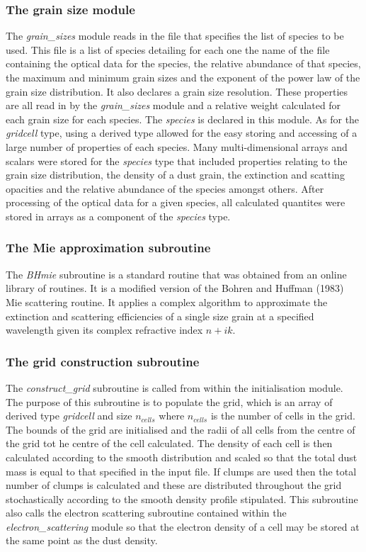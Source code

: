 		\subsubsection{The grain size module}
		The \textit{grain\_sizes} module reads in the file that specifies the list of species to be used.  This file is a list of species detailing for each one the name of the file containing the optical data for the species, the relative abundance of that species, the maximum and minimum grain sizes and the exponent of the power law of the grain size distribution.  It also declares a grain size resolution.  These properties are all read in by the \textit{grain\_sizes} module and a relative weight calculated for each grain size for each species.
		The \textit{species} is declared in this module.  As for the \textit{gridcell} type, using a derived type allowed for the easy storing and accessing of a large number of properties of each species.  Many multi-dimensional arrays and scalars were stored for the \textit{species} type that included properties relating to the grain size distribution, the density of a dust grain, the extinction and scatting opacities and the relative abundance of the species amongst others.  After processing of the optical data for a given species, all calculated quantites were stored in arrays as a component of the \textit{species} type. 
		
		\subsubsection{The Mie approximation subroutine}
		The \textit{BHmie} subroutine is a standard routine that  was obtained from an online library of routines.  It is a modified version of the Bohren and Huffman (1983) %
		Mie scattering routine.  It applies a complex algorithm to approximate the extinction and scattering efficiencies of a single size grain at a specified wavelength given its complex refractive index $n+ik$.
		
		\subsubsection{The grid construction subroutine}
		The \textit{construct\_grid} subroutine is called from within the initialisation module.  The purpose of this subroutine is to populate the grid, which is an array of derived type \textit{gridcell} and size $n_{cells}$ where $n_{cells}$ is the number of cells in the grid.   The bounds of the grid are initialised and the radii of all cells from the centre of the grid tot he centre of the cell calculated.  The density of each cell is then calculated according to the smooth distribution and scaled so that the total dust mass is equal to that specified in the input file.  If clumps are used then the total number of clumps is calculated and these are distributed throughout the grid stochastically according to the smooth density profile stipulated.
		This subroutine also calls the electron scattering subroutine contained within the \textit{electron\_scattering} module so that the electron density of a cell may be stored at the same point as the dust density.
		
